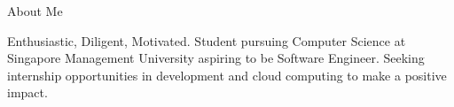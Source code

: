 \documentclass{resume} %
\begin{document}

\begin{rSection}{About Me}

Enthusiastic, Diligent, Motivated. Student pursuing Computer Science at Singapore Management University aspiring to be Software Engineer. Seeking internship opportunities in development and cloud computing to make a positive impact.

\end{rSection}

\end{document}
